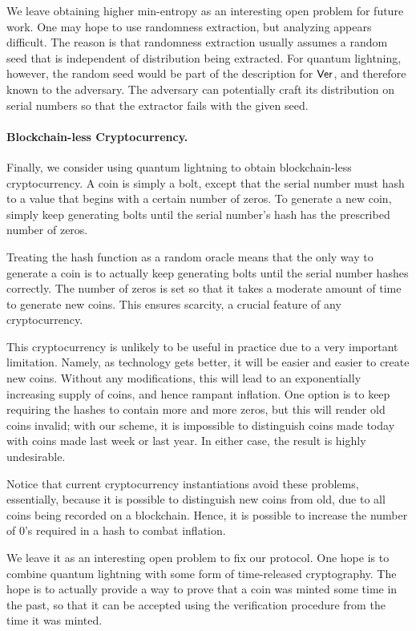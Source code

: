 We leave obtaining higher min-entropy as an interesting open problem for future work.  One may hope to use randomness extraction, but analyzing appears difficult.  The reason is that randomness extraction usually assumes a random seed that is independent of distribution being extracted.  For quantum lightning, however, the random seed would be part of the description for ${\sf Ver}$, and therefore known to the adversary.  The adversary can potentially craft its distribution on serial numbers so that the extractor fails with the given seed.

\paragraph{Blockchain-less Cryptocurrency.} Finally, we consider using quantum lightning to obtain blockchain-less cryptocurrency.  A coin is simply a bolt, except that the serial number must hash to a value that begins with a certain number of zeros.  To generate a new coin, simply keep generating bolts until the serial number's hash has the prescribed number of zeros.  

Treating the hash function as a random oracle means that the only way to generate a coin is to actually keep generating bolts until the serial number hashes correctly.  The number of zeros is set so that it takes a moderate amount of time to generate new coins.  This ensures scarcity, a crucial feature of any cryptocurrency.

This cryptocurrency is unlikely to be useful in practice due to a very important limitation.  Namely, as technology gets better, it will be easier and easier to create new coins.  Without any modifications, this will lead to an exponentially increasing supply of coins, and hence rampant inflation.  One option is to keep requiring the hashes to contain more and more zeros, but this will render old coins invalid; with our scheme, it is impossible to distinguish coins made today with coins made last week or last year.  In either case, the result is highly undesirable.  

Notice that current cryptocurrency instantiations avoid these problems, essentially, because it is possible to distinguish new coins from old, due to all coins being recorded on a blockchain.  Hence, it is possible to increase the number of 0's required in a hash to combat inflation.

We leave it as an interesting open problem to fix our protocol.  One hope is to combine quantum lightning with some form of time-released cryptography.  The hope is to actually provide a way to prove that a coin was minted some time in the past, so that it can be accepted using the verification procedure from the time it was minted.


